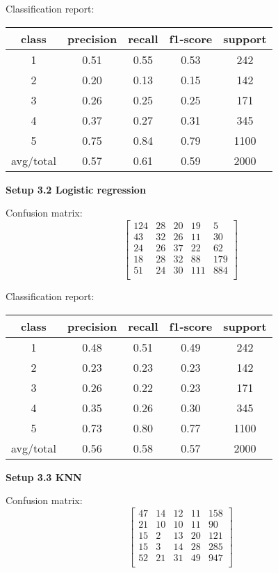 \documentclass[12pt]{report}
\begin{document}
Classification report:

\begin{center}
	\begin{tabular}{c | c | c | c | c }
		\hline
		class & precision & recall & f1-score & support \\ \hline
		1 & 0.51 & 0.55 & 0.53 & 242 \\ \hline
		2 & 0.20 & 0.13 & 0.15 & 142 \\ \hline
		3 & 0.26 & 0.25 & 0.25 & 171 \\ \hline
		4 & 0.37 & 0.27 & 0.31 & 345 \\ \hline
		5 & 0.75 & 0.84 & 0.79 & 1100 \\ \hline
		avg/total & 0.57 & 0.61 & 0.59 & 2000 \\ \hline
	\end{tabular}
\end{center}

\textbf{Setup 3.2 Logistic regression}

Confusion matrix:
\[
\begin{bmatrix}
124 & 28 & 20 & 19 & 5 \\
43 & 32 & 26 & 11 & 30 \\
24 & 26 & 37 & 22 & 62 \\
18 & 28 & 32 & 88 & 179 \\
51 & 24 & 30 & 111 & 884 \\
\end{bmatrix}
\]

Classification report:

\begin{center}
	\begin{tabular}{c | c | c | c | c }
		\hline
		class & precision & recall & f1-score & support \\ \hline
		1 & 0.48 & 0.51 & 0.49 & 242 \\ \hline
		2 & 0.23 & 0.23 & 0.23 & 142 \\ \hline
		3 & 0.26 & 0.22 & 0.23 & 171 \\ \hline
		4 & 0.35 & 0.26 & 0.30 & 345 \\ \hline
		5 & 0.73 & 0.80 & 0.77 & 1100 \\ \hline
		avg/total & 0.56 & 0.58 & 0.57 & 2000 \\ \hline
	\end{tabular}
\end{center}

\textbf{Setup 3.3 KNN}

Confusion matrix:
\[
\begin{bmatrix}
47 & 14 & 12 & 11 & 158 \\
21 & 10 & 10 & 11 & 90 \\
15 & 2 & 13 & 20 & 121 \\
15 & 3 & 14 & 28 & 285 \\
52 & 21 & 31 & 49 & 947 \\
\end{bmatrix}
\]
\end{document}
